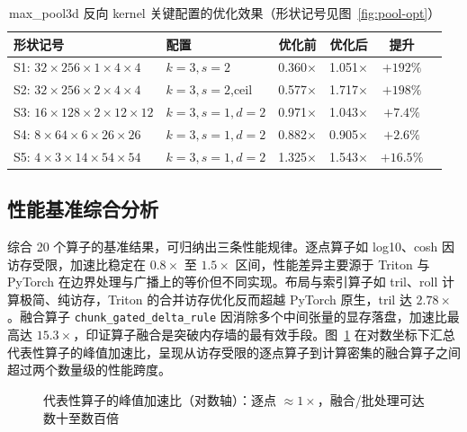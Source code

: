 \begin{table}[!htbp]
\centering\small
\caption{max\_pool3d 反向 kernel 关键配置的优化效果（形状记号见图~\ref{fig:pool-opt}）}
\label{tab:pool-opt}
\renewcommand{\arraystretch}{1.1}
\begin{tabular}{llcccc}
\toprule
形状记号 & 配置 & 优化前 & 优化后 & 提升 \\
\midrule
S1: $32\times256\times1\times4\times4$ & $k{=}3,s{=}2$ & 0.360$\times$ & 1.051$\times$ & $+192\%$ \\
S2: $32\times256\times2\times4\times4$ & $k{=}3,s{=}2$,ceil & 0.577$\times$ & 1.717$\times$ & $+198\%$ \\
S3: $16\times128\times2\times12\times12$ & $k{=}3,s{=}1,d{=}2$ & 0.971$\times$ & 1.043$\times$ & $+7.4\%$ \\
S4: $8\times64\times6\times26\times26$ & $k{=}3,s{=}1,d{=}2$ & 0.882$\times$ & 0.905$\times$ & $+2.6\%$ \\
S5: $4\times3\times14\times54\times54$ & $k{=}3,s{=}1,d{=}2$ & 1.325$\times$ & 1.543$\times$ & $+16.5\%$ \\
\bottomrule
\end{tabular}
\end{table}

\subsection{性能基准综合分析}
综合 20 个算子的基准结果，可归纳出三条性能规律。逐点算子如 log10、cosh 因访存受限，加速比稳定在 $0.8\times$ 至 $1.5\times$ 区间，性能差异主要源于 Triton 与 PyTorch 在边界处理与广播上的等价但不同实现。布局与索引算子如 tril、roll 计算极简、纯访存，Triton 的合并访存优化反而超越 PyTorch 原生，tril 达 $2.78\times$。融合算子 \texttt{chunk\_gated\_delta\_rule} 因消除多个中间张量的显存落盘，加速比最高达 $15.3\times$，印证算子融合是突破内存墙的最有效手段。图~\ref{fig:allbench} 在对数坐标下汇总代表性算子的峰值加速比，呈现从访存受限的逐点算子到计算密集的融合算子之间超过两个数量级的性能跨度。

\begin{figure}[!htbp]
\centering
{}
\caption{代表性算子的峰值加速比（对数轴）：逐点 $\approx 1\times$，融合/批处理可达数十至数百倍}
\label{fig:allbench}
\end{figure}

